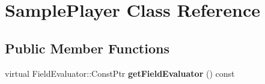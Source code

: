 \hypertarget{classSamplePlayer}{
\section{SamplePlayer Class Reference}
\label{classSamplePlayer}
}
\subsection*{Public Member Functions}
\begin{DoxyCompactItemize}
\item 
\hypertarget{classSamplePlayer_a2bd3710973bea2fd976d4f6f42e765d1}{
virtual FieldEvaluator::ConstPtr {\bfseries getFieldEvaluator} () const }
\label{classSamplePlayer_a2bd3710973bea2fd976d4f6f42e765d1}

\end{DoxyCompactItemize}
